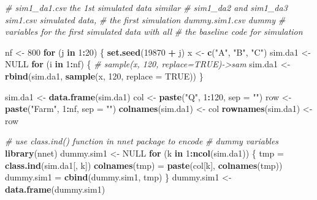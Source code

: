 \documentclass[12pt,]{krantz}
\makeatletter
\newenvironment{Shaded}{\begin{snugshade}}{\end{snugshade}}
\newcommand{\CommentTok}[1]{\textcolor[rgb]{0.37,0.37,0.37}{\textit{#1}}}
\newcommand{\ControlFlowTok}[1]{\textcolor[rgb]{0.27,0.27,0.27}{\textbf{#1}}}
\newcommand{\DataTypeTok}[1]{\textcolor[rgb]{0.27,0.27,0.27}{#1}}
\newcommand{\DecValTok}[1]{\textcolor[rgb]{0.06,0.06,0.06}{#1}}
\newcommand{\KeywordTok}[1]{\textcolor[rgb]{0.27,0.27,0.27}{\textbf{#1}}}
\newcommand{\NormalTok}[1]{#1}
\newcommand{\OperatorTok}[1]{\textcolor[rgb]{0.43,0.43,0.43}{\textbf{#1}}}
\newcommand{\OtherTok}[1]{\textcolor[rgb]{0.37,0.37,0.37}{#1}}
\newcommand{\StringTok}[1]{\textcolor[rgb]{0.5,0.5,0.5}{#1}}
\newenvironment{kframe}{%
\medskip{}
\setlength{\fboxsep}{.8em}
 \def\at@end@of@kframe{}%
 \ifinner\ifhmode%
  \def\at@end@of@kframe{\end{minipage}}%
  \begin{minipage}{\columnwidth}%
 \fi\fi%
 \def\FrameCommand##1{\hskip\@totalleftmargin \hskip-\fboxsep
 \colorbox{shadecolor}{##1}\hskip-\fboxsep
     \hskip-\linewidth \hskip-\@totalleftmargin \hskip\columnwidth}%
 \MakeFramed {\advance\hsize-\width
   \@totalleftmargin\z@ \linewidth\hsize
   \@setminipage}}%
 {\par\unskip\endMakeFramed%
 \at@end@of@kframe}
\renewenvironment{Shaded}{\begin{kframe}}{\end{kframe}}
\makeatother
\begin{document}
\begin{Shaded}
\begin{Highlighting}[]
\CommentTok{# sim1_da1.csv the 1st simulated data similar}
\CommentTok{# sim1_da2 and sim1_da3 sim1.csv simulated data,}
\CommentTok{# the first simulation dummy.sim1.csv dummy}
\CommentTok{# variables for the first simulated data with all}
\CommentTok{# the baseline code for simulation}

\NormalTok{nf <-}\StringTok{ }\DecValTok{800}
\ControlFlowTok{for}\NormalTok{ (j }\ControlFlowTok{in} \DecValTok{1}\OperatorTok{:}\DecValTok{20}\NormalTok{) \{}
    \KeywordTok{set.seed}\NormalTok{(}\DecValTok{19870} \OperatorTok{+}\StringTok{ }\NormalTok{j)}
\NormalTok{    x <-}\StringTok{ }\KeywordTok{c}\NormalTok{(}\StringTok{"A"}\NormalTok{, }\StringTok{"B"}\NormalTok{, }\StringTok{"C"}\NormalTok{)}
\NormalTok{    sim.da1 <-}\StringTok{ }\OtherTok{NULL}
    \ControlFlowTok{for}\NormalTok{ (i }\ControlFlowTok{in} \DecValTok{1}\OperatorTok{:}\NormalTok{nf) \{}
        \CommentTok{# sample(x, 120, replace=TRUE)->sam}
\NormalTok{        sim.da1 <-}\StringTok{ }\KeywordTok{rbind}\NormalTok{(sim.da1, }\KeywordTok{sample}\NormalTok{(x, }\DecValTok{120}\NormalTok{, }\DataTypeTok{replace =} \OtherTok{TRUE}\NormalTok{))}
\NormalTok{    \}}
    
\NormalTok{    sim.da1 <-}\StringTok{ }\KeywordTok{data.frame}\NormalTok{(sim.da1)}
\NormalTok{    col <-}\StringTok{ }\KeywordTok{paste}\NormalTok{(}\StringTok{"Q"}\NormalTok{, }\DecValTok{1}\OperatorTok{:}\DecValTok{120}\NormalTok{, }\DataTypeTok{sep =} \StringTok{""}\NormalTok{)}
\NormalTok{    row <-}\StringTok{ }\KeywordTok{paste}\NormalTok{(}\StringTok{"Farm"}\NormalTok{, }\DecValTok{1}\OperatorTok{:}\NormalTok{nf, }\DataTypeTok{sep =} \StringTok{""}\NormalTok{)}
    \KeywordTok{colnames}\NormalTok{(sim.da1) <-}\StringTok{ }\NormalTok{col}
    \KeywordTok{rownames}\NormalTok{(sim.da1) <-}\StringTok{ }\NormalTok{row}
    
    \CommentTok{# use class.ind() function in nnet package to encode}
    \CommentTok{# dummy variables}
    \KeywordTok{library}\NormalTok{(nnet)}
\NormalTok{    dummy.sim1 <-}\StringTok{ }\OtherTok{NULL}
    \ControlFlowTok{for}\NormalTok{ (k }\ControlFlowTok{in} \DecValTok{1}\OperatorTok{:}\KeywordTok{ncol}\NormalTok{(sim.da1)) \{}
\NormalTok{        tmp =}\StringTok{ }\KeywordTok{class.ind}\NormalTok{(sim.da1[, k])}
        \KeywordTok{colnames}\NormalTok{(tmp) =}\StringTok{ }\KeywordTok{paste}\NormalTok{(col[k], }\KeywordTok{colnames}\NormalTok{(tmp))}
\NormalTok{        dummy.sim1 =}\StringTok{ }\KeywordTok{cbind}\NormalTok{(dummy.sim1, tmp)}
\NormalTok{    \}}
\NormalTok{    dummy.sim1 <-}\StringTok{ }\KeywordTok{data.frame}\NormalTok{(dummy.sim1)}
    

\end{Highlighting}
\end{Shaded}
\end{document}
